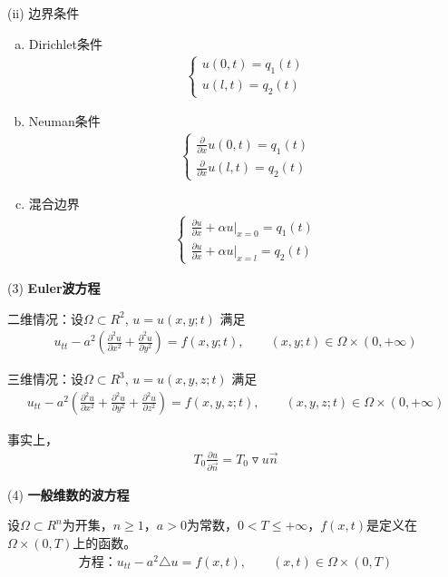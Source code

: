 \documentclass[11pt, a4paper]{article}
\theoremstyle{theorem}
\begin{document}
(ii) 边界条件
\begin{enumerate}[(a)]
  \item Dirichlet条件
  \begin{align*}
      \begin{cases}
      u(0, t) = q_1(t) \\
      u(l, t) = q_2(t)
      \end{cases}
  \end{align*}
  \item Neuman条件
    \begin{align*}
      \begin{cases}
      \frac{\partial }{\partial x}u(0, t) = q_1(t) \\
      \frac{\partial }{\partial x}u(l, t) = q_2(t)
      \end{cases}
  \end{align*}
  \item 混合边界
    \begin{align*}
      \begin{cases}
      \frac{\partial u}{\partial x} + \alpha u |_{x = 0}= q_1(t) \\
      \frac{\partial u}{\partial x} + \alpha u |_{x = l}= q_2(t)
      \end{cases}
  \end{align*}
\end{enumerate}

(3) \textbf{Euler波方程}

二维情况：设$\Omega \subset R^2$, $u = u(x, y;t)$ 满足
\begin{align}
    u_{tt} - a^2 \left(\frac{\partial^2 u}{\partial x^2} + \frac{\partial^2 u}{\partial y^2} \right) = f(x,y; t), \quad \quad (x,y; t) \in \Omega \times (0, +\infty)
\end{align}

三维情况：设$\Omega \subset R^3$, $u = u(x, y, z;t)$ 满足
\begin{align}
    u_{tt} - a^2 \left(\frac{\partial^2 u}{\partial x^2} + \frac{\partial^2 u}{\partial y^2} + \frac{\partial^2 u}{\partial z^2}\right) = f(x,y,z; t), \quad \quad (x,y,z; t) \in \Omega \times (0, +\infty)
\end{align}

事实上，
\begin{align}
    T_0 \frac{\partial u}{\partial \vec{n}} = T_0 \triangledown u \vec{n}
\end{align}

(4) \textbf{一般维数的波方程}

设$\Omega \subset R^n$为开集，$n \geq 1$，$a > 0$为常数，$0 < T \leq + \infty$，$f(x,t)$是定义在$\Omega \times (0, T)$上的函数。
\begin{align}
    \text{方程：} u_{tt} - a^2 \triangle u = f(x,t), \quad \quad (x,t) \in \Omega \times (0, T)
\end{align}
\end{document}
